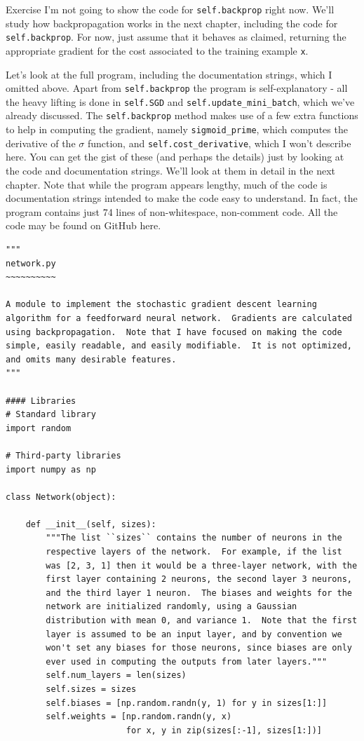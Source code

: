 \begin{exerciseBox}{Exercise}
I'm not going to show the code for \texttt{self.backprop} right now. We'll study how backpropagation works in the next chapter, including the code for \texttt{self.backprop}. For now, just assume that it behaves as claimed, returning the appropriate gradient for the cost associated to the training example \texttt{x}.


Let's look at the full program, including the documentation strings, which I omitted above. Apart from \texttt{self.backprop} the program is self-explanatory - all the heavy lifting is done in \texttt{self.SGD} and \texttt{self.update\_\allowbreak{}mini\_\allowbreak{}batch}, which we've already discussed. The \texttt{self.backprop} method makes use of a few extra functions to help in computing the gradient, namely \texttt{sigmoid\_\allowbreak{}prime}, which computes the derivative of the $\sigma$ function, and \texttt{self.cost\_\allowbreak{}derivative}, which I won't describe here. You can get the gist of these (and perhaps the details) just by looking at the code and documentation strings. We'll look at them in detail in the next chapter. Note that while the program appears lengthy, much of the code is documentation strings intended to make the code easy to understand. In fact, the program contains just 74 lines of non-whitespace, non-comment code. All the code may be found on GitHub here.



\begin{lstlisting}
"""
network.py
~~~~~~~~~~

A module to implement the stochastic gradient descent learning
algorithm for a feedforward neural network.  Gradients are calculated
using backpropagation.  Note that I have focused on making the code
simple, easily readable, and easily modifiable.  It is not optimized,
and omits many desirable features.
"""

#### Libraries
# Standard library
import random

# Third-party libraries
import numpy as np

class Network(object):

    def __init__(self, sizes):
        """The list ``sizes`` contains the number of neurons in the
        respective layers of the network.  For example, if the list
        was [2, 3, 1] then it would be a three-layer network, with the
        first layer containing 2 neurons, the second layer 3 neurons,
        and the third layer 1 neuron.  The biases and weights for the
        network are initialized randomly, using a Gaussian
        distribution with mean 0, and variance 1.  Note that the first
        layer is assumed to be an input layer, and by convention we
        won't set any biases for those neurons, since biases are only
        ever used in computing the outputs from later layers."""
        self.num_layers = len(sizes)
        self.sizes = sizes
        self.biases = [np.random.randn(y, 1) for y in sizes[1:]]
        self.weights = [np.random.randn(y, x)
                        for x, y in zip(sizes[:-1], sizes[1:])]


\end{lstlisting}
\end{exerciseBox}

